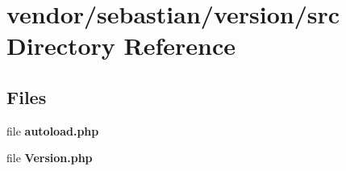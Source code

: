 \section{vendor/sebastian/version/src Directory Reference}
\label{dir_70fb981c578af3a84a3d8d1327eea061}
\subsection*{Files}
\begin{DoxyCompactItemize}
\item 
file {\bf autoload.\+php}
\item 
file {\bf Version.\+php}
\end{DoxyCompactItemize}
